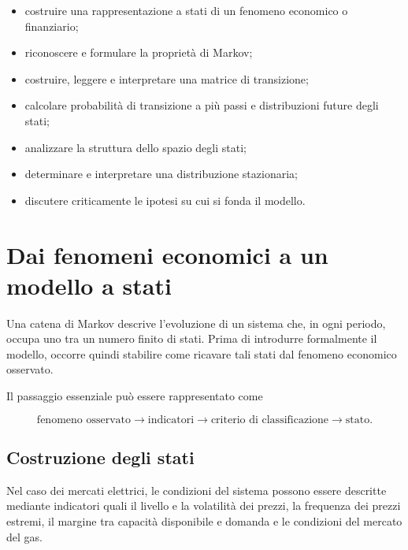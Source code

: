 \begin{itemize}

\item costruire una rappresentazione a stati di un fenomeno economico o
finanziario;

\item riconoscere e formulare la propriet\`{a} di Markov;

\item costruire, leggere e interpretare una matrice di transizione;

\item calcolare probabilit\`{a} di transizione a pi\`{u} passi e
distribuzioni future degli stati;

\item analizzare la struttura dello spazio degli stati;

\item determinare e interpretare una distribuzione stazionaria;

\item discutere criticamente le ipotesi su cui si fonda il modello.

\end{itemize}

\section{Dai fenomeni economici a un modello a stati}

Una catena di Markov descrive l'evoluzione di un sistema che, in ogni
periodo, occupa uno tra un numero finito di stati. Prima di introdurre
formalmente il modello, occorre quindi stabilire come ricavare tali
stati dal fenomeno economico osservato.

Il passaggio essenziale pu\`{o} essere rappresentato come

\[
\text{fenomeno osservato}
\longrightarrow
\text{indicatori}
\longrightarrow
\text{criterio di classificazione}
\longrightarrow
\text{stato}.
\]

\subsection{Costruzione degli stati}

Nel caso dei mercati elettrici, le condizioni del sistema possono
essere descritte mediante indicatori quali il livello e la
volatilit\`{a} dei prezzi, la frequenza dei prezzi estremi, il margine
tra capacit\`{a} disponibile e domanda e le condizioni del mercato del
gas.

